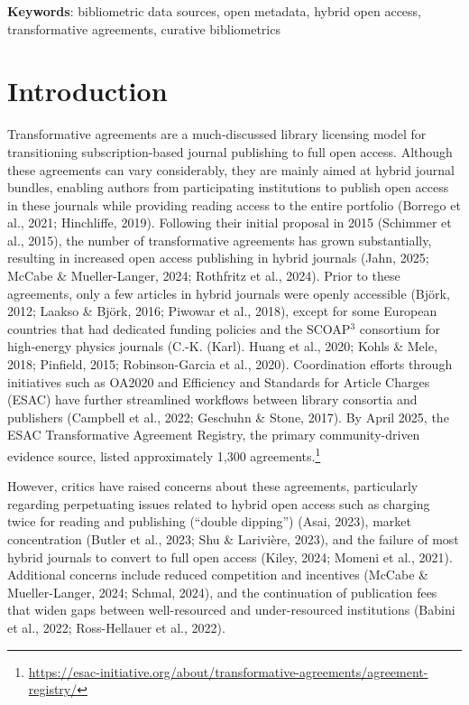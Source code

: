 \documentclass[a4paper,man,floatsintext,longtable,noextraspace,10pt]{apa6}
\begin{document}
{\textbf{Keywords}: bibliometric data sources, open metadata, hybrid open access, transformative agreements, curative bibliometrics}

\newpage

\setcounter{secnumdepth}{2}

\section{Introduction}\label{introduction}

Transformative agreements are a much-discussed library licensing model
for transitioning subscription-based journal publishing to full open
access. Although these agreements can vary considerably, they are mainly
aimed at hybrid journal bundles, enabling authors from participating
institutions to publish open access in these journals while providing
reading access to the entire portfolio (Borrego et al., 2021;
Hinchliffe, 2019). Following their initial proposal in 2015 (Schimmer et
al., 2015), the number of transformative agreements has grown
substantially, resulting in increased open access publishing in hybrid
journals (Jahn, 2025; McCabe \& Mueller-Langer, 2024; Rothfritz et al.,
2024). Prior to these agreements, only a few articles in hybrid journals
were openly accessible (Björk, 2012; Laakso \& Björk, 2016; Piwowar et
al., 2018), except for some European countries that had dedicated
funding policies and the SCOAP\(^3\) consortium for high-energy physics
journals (C.-K. (Karl). Huang et al., 2020; Kohls \& Mele, 2018;
Pinfield, 2015; Robinson-Garcia et al., 2020). Coordination efforts
through initiatives such as OA2020 and Efficiency and Standards for
Article Charges (ESAC) have further streamlined workflows between
library consortia and publishers (Campbell et al., 2022; Geschuhn \&
Stone, 2017). By April 2025, the ESAC Transformative Agreement Registry,
the primary community-driven evidence source, listed approximately 1,300
agreements.\footnote{\url{https://esac-initiative.org/about/transformative-agreements/agreement-registry/}}

However, critics have raised concerns about these agreements,
particularly regarding perpetuating issues related to hybrid open access
such as charging twice for reading and publishing (``double dipping'')
(Asai, 2023), market concentration (Butler et al., 2023; Shu \&
Larivière, 2023), and the failure of most hybrid journals to convert to
full open access (Kiley, 2024; Momeni et al., 2021). Additional concerns
include reduced competition and incentives (McCabe \& Mueller-Langer,
2024; Schmal, 2024), and the continuation of publication fees that widen
gaps between well-resourced and under-resourced institutions (Babini et
al., 2022; Ross-Hellauer et al., 2022).
\end{document}
